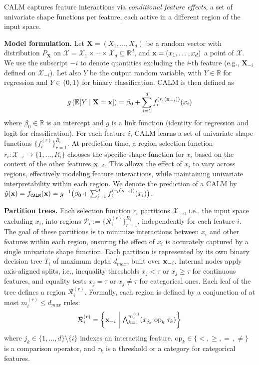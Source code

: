 CALM captures feature interactions via \emph{conditional feature effects}, a set of univariate shape functions per feature, 
each active in a different region of the input space.

\label{subsec:model-overview}

\textbf{Model formulation.}
Let $\mathbf{X}=(X_1,\ldots,X_d)$ be a random vector with distribution $P_{\mathbf{X}}$ on $\mathcal{X}=\mathcal{X}_1 \times \cdots \times \mathcal{X}_d\subseteq\mathbb{R}^d$, and $\mathbf{x}=(x_1,\ldots,x_d)$ a point of $\mathcal{X}$.
We use the subscript $-i$ to denote quantities excluding the $i$-th feature (e.g., $\mathbf{X}_{-i}$ defined on $\mathcal{X}_{-i}$). Let also $Y$ be the output random variable, with $Y\in\mathbb{R}$ for regression and $Y\in\{0,1\}$ for binary classification.
CALM is then defined as
\begin{equation}
    \label{eq:CALM}
    g \left ( \mathbb{E}[Y \mid \mathbf{X}=\mathbf{x} ] \right ) = \beta_0 + \sum_{i=1}^d f_i^{(r_i(\mathbf{x}_{-i}))}(x_i)
\end{equation}
where 
\( \beta_0 \in \mathbb{R} \) is an intercept and
\( g \) is a link function (identity for regression and logit for classification).
For each feature $i$, CALM learns a set of univariate shape functions \( \{ f_i^{(r)} \}_{r=1}^{R_i} \).
At prediction time, a region selection function $r_i: \mathcal{X}_{-i} \to \{1, \ldots, R_i\}$ chooses the specific shape function for $x_i$ based on the context of the other features $\mathbf{x}_{-i}$.
This allows the effect of $x_i$ to vary across regions, effectively modeling feature interactions, while maintaining univariate interpretability within each region.
We denote the prediction of a CALM by $\hat y(\mathbf{x})=f_{\texttt{CALM}}(\mathbf{x})=g^{-1}\big(\beta_0+\sum_{i=1}^d f_i^{(r_i(\mathbf{x}_{-i}))}(x_i)\big)$.

\textbf{Partition trees.}
Each selection function \( r_i \) partitions $\mathcal{X}_{-i}$, i.e., the input space excluding $x_i$, into regions $\mathcal{P}_i := \{\mathcal{R}_i^{(r)}\}_{r=1}^{R_i}$, independently for each feature $i$.
The goal of these partitions is to minimize interactions between $x_i$ and other features within each region, ensuring the effect of $x_i$ is accurately captured by a single univariate shape function.
Each partition is represented by its own binary decision tree $T_i$ of maximum depth $d_{max}$, built over $\mathbf{x}_{-i}$. 
Internal nodes apply axis-aligned splits, i.e., inequality thresholds \(x_j < \tau\) or $x_j \geq \tau$ for continuous features, and equality tests \( x_j = \tau \) or \(x_j \neq \tau\) for categorical ones. 
Each leaf of the tree defines a region \(\mathcal{R}_i^{(r)}\).
Formally, each region is defined by a conjunction of at most $m_i^{(r)} \leq d_{max}$ rules:
\begin{equation}
\label{eq:region-definition}
\mathcal{R}_i^{(r)} = \left\{ \mathbf{x}_{-i}  \;\middle|\; \textstyle\bigwedge_{k=1}^{m_i^{(r)}} (x_{j_k} \;\text{op}_k\; \tau_k)  \right\}
\end{equation}
where 
\( j_k \in \{1, \dots, d\} \setminus \{i\} \) indexes an interacting feature, 
\( \text{op}_k \in \{<, \geq, =\,, \ne\} \) is a comparison operator,
and
 \( \tau_k \) is a threshold or a category for categorical features.

